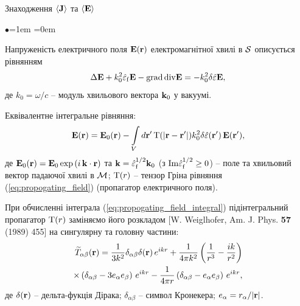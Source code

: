 \documentclass[10pt]{beamer}
\begin{document}
\begin{frame}{Знаходження $\langle {\bf J} \rangle$ та $\langle {\bf E} \rangle$}
\footnotesize

\begin{list}{$\bullet$}{\leftmargin=1em \itemindent=0em}
\item
Напруженість електричного поля ${\bf E} ({\bf r})$ електромагнітної хвилі в $\cal{S}$ описується рівнянням
\begin{equation} \label{eq:propogating_field}
\Delta {\bf E} + k_0^{2}\hat{\varepsilon}_{\rm f} {\bf E} - {\rm
grad}\, {\rm div} {\bf E} = - k_{0}^{2} \delta
\hat{\varepsilon} {\bf E},
\end{equation}
де $k_0=\omega/c$ -- модуль хвильового вектора ${\bf k}_0$ у вакуумі.

\item
Еквівалентне інтегральне рівняння:
\begin{equation}\label{eq:propogating_field_integral} 
{\rm {\bf E}}({\rm {\bf r}}) = {\rm {\bf E}}_{0} ({\rm
{\bf r}}) - {\int\limits_{V} {d{\rm {\bf {r}'}}\,}} {\rm T}(|{\rm {\bf
r}}-{\rm {\bf {r}'}}|) k_{0}^{2} \delta \hat{\varepsilon} ({\rm
{\bf {r}'}})\,{\rm {\bf E}}({\rm {\bf {r}'}}),
\end{equation}
де ${\bf E}_0 ({\bf r}) = {\bf E}_0 \exp{(i\, {\bf k} \cdot{\bf r})}$ та ${\bf k} = \hat{\varepsilon}_{\rm f}^{1/2} {\bf k}_0$ (з ${\rm Im}{\hat{\varepsilon}_{\rm f}}^{1/2} \geq 0$) -- поле та хвильовий вектор падаючої хвилі в $\cal{M}$;
${\rm T}(r)$ -- тензор Гріна рівняння (\ref{eq:propogating_field}) (пропагатор електричного поля). 

\item
При обчисленні інтеграла (\ref{eq:propogating_field_integral}) підінтегральний пропагатор ${\rm T}(r)$ заміняємо його розкладом [W. Weiglhofer, Am. J. Phys. {\bf 57} (1989) 455] на сингулярну та головну частини:
\begin{eqnarray}\label{eq:propog_representation} 
{\widetilde T}_{\alpha\beta} ({\rm {\bf
r}}) = \frac{1}{3k^{2}} \delta_{\alpha\beta} \delta ({\rm {\bf
r}})\,e^{ikr} + \frac{1}{4\pi k^{2}}
\left(\frac{1}{r^3}-\frac{ik}{r^2}\right)\nonumber\\
\times\left( \delta _{\alpha\beta} - 3e_{\alpha} e_{\beta}
\right)\,e^{ikr} - \frac{1}{4\pi r}\left( {\delta _{\alpha\beta} -
e_{\alpha} e_{\beta}} \right)\,e^{ikr},
\end{eqnarray}
де $\delta({\bf r})$ -- дельта-фукція Дірака; $\delta_{\alpha\beta}$ -- символ Кронекера; $e_\alpha = r_\alpha/|{\bf r}|$.

\end{list}

\end{frame}
\end{document}
